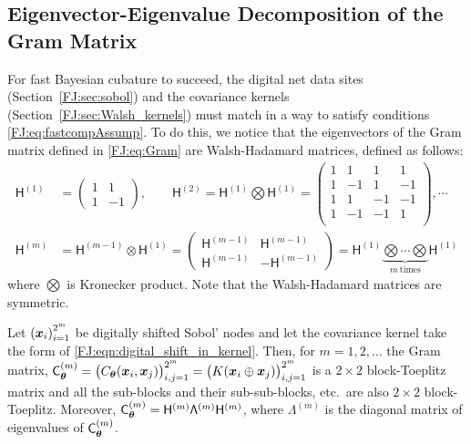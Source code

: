 \documentclass[graybox,footinfo]{svmult}
\begin{document}
\subsection{Eigenvector-Eigenvalue Decomposition of the Gram Matrix}

For fast Bayesian cubature to succeed, the digital net data sites (Section~\ref{FJ:sec:sobol}) and the covariance kernels (Section~\ref{FJ:sec:Walsh_kernels}) must match in a way to satisfy  conditions \eqref{FJ:eq:fastcompAssump}.  To do this, we notice that the eigenvectors of the Gram matrix defined in \eqref{FJ:eq:Gram} are Walsh-Hadamard matrices, defined as follows:
\begin{align}
\nonumber
\mathsf{H}^{(1)} &=
\begin{pmatrix}
1 & 1 \\ 1 & -1
\end{pmatrix}, \qquad
\mathsf{H}^{(2)} = \mathsf{H}^{(1)} \bigotimes \mathsf{H}^{(1)} = 
\begin{pmatrix}
1 & 1 & 1 & 1 \\ 
1 & -1 & 1 & -1 \\
1 & 1 & -1 & -1 \\ 
1 & -1 & -1 & 1 \\
\end{pmatrix}, \cdots
\\
\label{FJ:eqn:hadamard_matrix}
\mathsf{H}^{(m)} &= \mathsf{H}^{(m-1)} \otimes \mathsf{H}^{(1)} =
\begin{pmatrix}
\mathsf{H}^{(m-1)} & \mathsf{H}^{(m-1)} \\ \mathsf{H}^{(m-1)} & -\mathsf{H}^{(m-1)}
\end{pmatrix} 
= \mathsf{H}^{(1)} \underbrace{\bigotimes \cdots \bigotimes}_{m \ \text{times}}  \mathsf{H}^{(1)} 
\end{align}
where $\bigotimes$ is Kronecker product.
Note that the Walsh-Hadamard matrices are symmetric.

\begin{lemma} \label{FJ:lemma:eig}
    Let $\left({\boldsymbol{x}}_i\right)_{i=1}^{2^m}$ be digitally shifted Sobol' nodes and let the covariance kernel take the form of \eqref{FJ:eqn:digital_shift_in_kernel}. Then, for $m = 1, 2, \ldots$ the Gram matrix, $
	\mathsf{C}_{{\boldsymbol{\theta}}}^{(m)} = \bigl(C_{\boldsymbol{\theta}}({\boldsymbol{x}}_i, {\boldsymbol{x}}_j)\bigr)_{i,j=1}^{2^m} = \bigl(K({\boldsymbol{x}}_i \oplus {\boldsymbol{x}}_j)\bigr)_{i,j=1}^{2^m}$ is a $2\times 2$ block-Toeplitz matrix and all the sub-blocks and their sub-sub-blocks, etc.\ are also $2\times 2$ block-Toeplitz. Moreover, $\mathsf{C}_{{\boldsymbol{\theta}}}^{(m)} = \mathsf{H}^{(m)} \mathsf{\Lambda}^{(m)}\mathsf{H}^{(m)}$, where $\mathsf{\Lambda}^{(m)}$ is the diagonal matrix of eigenvalues of $\mathsf{C}_{{\boldsymbol{\theta}}}^{(m)}$.
\end{lemma}
\end{document}
